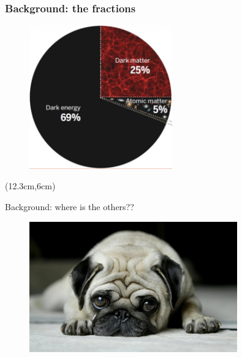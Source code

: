 \documentclass[aspectratio=1610]{beamer}
\begin{document}
\begin{frame}
  \frametitle{Background: the fractions}
  \begin{figure}
    \includegraphics[width=0.55\textwidth]{fraction.jpg}
  \end{figure}
  \begin{textblock*}{4cm}(12.3cm,6cm)
    {\color{red}{Stars only account for $\sim$0.07\%}}
  \end{textblock*}
\end{frame}
\begin{frame}{Background: where is the others??}
  \begin{figure}
    \includegraphics[width=0.8\textwidth]{lonely-dog.jpg}
  \end{figure}
\end{frame}
\end{document}
